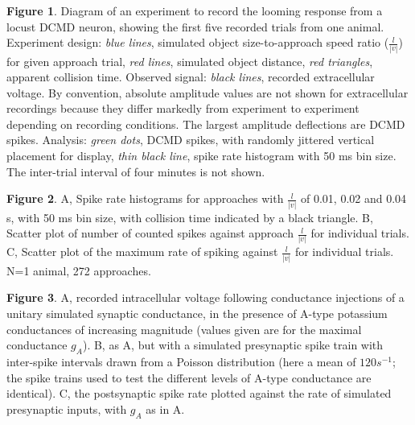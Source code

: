 \documentclass[11pt]{article}
\begin{document}
\textbf{Figure 1}. Diagram of an experiment to record the looming
response from a locust DCMD neuron, showing the first five recorded
trials from one animal. Experiment design: \emph{blue lines},
simulated object size-to-approach speed ratio ($\frac{l}{|v|}$) for
given approach trial, \emph{red lines}, simulated object distance,
\emph{red triangles}, apparent collision time. Observed signal:
\emph{black lines}, recorded extracellular voltage. By convention,
absolute amplitude values are not shown for extracellular recordings
because they differ markedly from experiment to experiment depending
on recording conditions. The largest amplitude deflections are DCMD
spikes. Analysis: \emph{green dots}, DCMD spikes, with randomly
jittered vertical placement for display, \emph{thin black line}, spike
rate histogram with 50 ms bin size. The inter-trial interval of four
minutes is not shown.

\flushleft \textbf{Figure 2}. A, Spike rate histograms for approaches with
$\frac{l}{|v|}$ of 0.01, 0.02 and 0.04 s, with 50 ms bin size, with
collision time indicated by a black triangle. B, Scatter plot of
number of counted spikes against approach $\frac{l}{|v|}$ for
individual trials. C, Scatter plot of the maximum rate of spiking
against $\frac{l}{|v|}$ for individual trials. N=1 animal, 272
approaches.

\flushleft \textbf{Figure 3}. A, recorded intracellular voltage following
conductance injections of a unitary simulated synaptic conductance, in
the presence of A-type potassium conductances of increasing magnitude
(values given are for the maximal conductance $g_A$). B, as A, but
with a simulated presynaptic spike train with inter-spike intervals
drawn from a Poisson distribution (here a mean of $120 s^{-1}$; the spike
trains used to test the different levels of A-type conductance are
identical). C, the postsynaptic spike rate plotted against the rate of
simulated presynaptic inputs, with $g_A$ as in A.





%

\pagebreak
\end{document}
